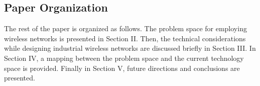 %
%

    \subsection{Paper Organization}
    The rest of the paper is organized as follows. The problem space for employing wireless networks is presented in Section II. Then, the technical considerations while designing industrial wireless networks are discussed briefly in Section III.  In Section IV, a mapping between the problem space and the current technology space is provided. Finally in Section V, future directions and conclusions are presented.
    
